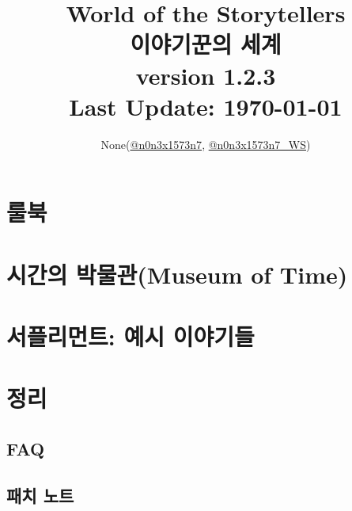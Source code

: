 \documentclass[12pt]{report}
\title{
	World of the Storytellers\\
	이야기꾼의 세계\\
	\large version 1.2.3\\
	Last Update: \today
	\ifDLC{\\ \textcolor{red}{DLC ENABLED}}\fi
}
\author{None(\href{https://www.twitter.com/n0n3x1573n7}{@n0n3x1573n7}, \href{https://www.twitter.com/n0n3x1573n7_WS}{@n0n3x1573n7\_WS})}
\date{}
\begin{document}
	\maketitle

	\vspace*{\fill}
	{\doclicenseThis}
	
	\setcounter{tocdepth}{-1}
	
\iffalse
	\chapter*{서론}
		
\fi
	
	\tableofcontents
	
	\part{룰북}
		
	
	\part{시간의 박물관(Museum of Time)}
		
	
	\part{서플리먼트: 예시 이야기들} \label{endof_MoT}
		
	
	\part{정리}
		\chapter*{FAQ}
			
		
		\chapter*{패치 노트}
			
		
			\printindex
	
	\vspace*{\fill}
	{\doclicenseThis}
	
\end{document}
